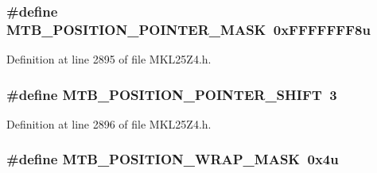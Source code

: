 \subsubsection[{\texorpdfstring{M\+T\+B\+\_\+\+P\+O\+S\+I\+T\+I\+O\+N\+\_\+\+P\+O\+I\+N\+T\+E\+R\+\_\+\+M\+A\+SK}{MTB_POSITION_POINTER_MASK}}]{\setlength{\rightskip}{0pt plus 5cm}\#define M\+T\+B\+\_\+\+P\+O\+S\+I\+T\+I\+O\+N\+\_\+\+P\+O\+I\+N\+T\+E\+R\+\_\+\+M\+A\+SK~0x\+F\+F\+F\+F\+F\+F\+F8u}\hypertarget{group___m_t_b___register___masks_gadb8fe67da29e5443d81624d913c6a5da}{}\label{group___m_t_b___register___masks_gadb8fe67da29e5443d81624d913c6a5da}


Definition at line 2895 of file M\+K\+L25\+Z4.\+h.

\subsubsection[{\texorpdfstring{M\+T\+B\+\_\+\+P\+O\+S\+I\+T\+I\+O\+N\+\_\+\+P\+O\+I\+N\+T\+E\+R\+\_\+\+S\+H\+I\+FT}{MTB_POSITION_POINTER_SHIFT}}]{\setlength{\rightskip}{0pt plus 5cm}\#define M\+T\+B\+\_\+\+P\+O\+S\+I\+T\+I\+O\+N\+\_\+\+P\+O\+I\+N\+T\+E\+R\+\_\+\+S\+H\+I\+FT~3}\hypertarget{group___m_t_b___register___masks_ga7857f68d5a75794dbf744b3c484f782f}{}\label{group___m_t_b___register___masks_ga7857f68d5a75794dbf744b3c484f782f}


Definition at line 2896 of file M\+K\+L25\+Z4.\+h.

\subsubsection[{\texorpdfstring{M\+T\+B\+\_\+\+P\+O\+S\+I\+T\+I\+O\+N\+\_\+\+W\+R\+A\+P\+\_\+\+M\+A\+SK}{MTB_POSITION_WRAP_MASK}}]{\setlength{\rightskip}{0pt plus 5cm}\#define M\+T\+B\+\_\+\+P\+O\+S\+I\+T\+I\+O\+N\+\_\+\+W\+R\+A\+P\+\_\+\+M\+A\+SK~0x4u}\hypertarget{group___m_t_b___register___masks_ga78e2e577559e338f1c3b58cc1cc63805}{}\label{group___m_t_b___register___masks_ga78e2e577559e338f1c3b58cc1cc63805}


